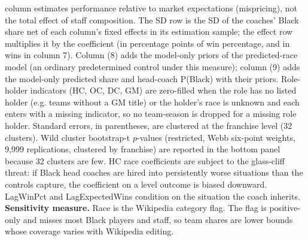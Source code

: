 \begin{table}[!h]
{\begin{threeparttable}
\begin{tablenotes}[para]
column estimates performance relative to market expectations (mispricing), not the total effect of staff composition. The SD row is the SD of the coaches' Black share net of each column's fixed effects in its estimation sample; the effect row multiplies it by the coefficient (in percentage points of win percentage, and in wins in column 7). Column (8) adds the model-only priors of the predicted-race model (an ordinary predetermined control under this measure); column (9) adds the model-only predicted share and head-coach P(Black) with their priors. Role-holder indicators (HC, OC, DC, GM) are zero-filled when the role has no listed holder (e.g. teams without a GM title) or the holder's race is unknown and each enters with a missing indicator, so no team-season is dropped for a missing role holder. Standard errors, in parentheses, are clustered at the franchise level (32 clusters). Wild cluster bootstrap-t $p$-values (restricted, Webb six-point weights, 9,999 replications, clustered by franchise) are reported in the bottom panel because 32 clusters are few. HC race coefficients are subject to the glass-cliff threat: if Black head coaches are hired into persistently worse situations than the controls capture, the coefficient on a level outcome is biased downward. LagWinPct and LagExpectedWins condition on the situation the coach inherits. \textbf{Sensitivity measure.} Race is the Wikipedia category flag. The flag is positive-only and misses most Black players and staff, so team shares are lower bounds whose coverage varies with Wikipedia editing.
\end{tablenotes}
\end{threeparttable}}
\end{table}
